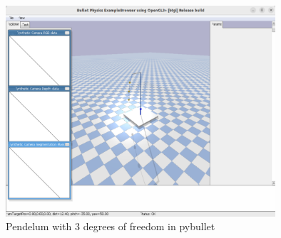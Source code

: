  \begin{figure}[h!]
 	\label{pend}
 	\centering
 	\includegraphics[width=10cm]{chapters/chapter3/pendulum.pdf}
 	\caption{Pendelum with 3 degrees of freedom in pybullet}
 \end{figure}




 
 


 

